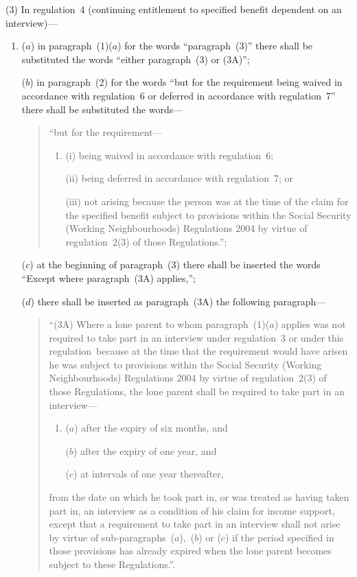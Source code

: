 \documentclass[12pt,a4paper]{article}
\begin{document}
(3) In regulation~4 (continuing entitlement to specified benefit dependent on an interview)—
\begin{enumerate}\item[]
($a$) in paragraph~(1)($a$)  for the words “paragraph~(3)” there shall be substituted the words “either paragraph~(3) or (3A)”;

($b$) in paragraph~(2) for the words “but for the requirement being waived in accordance with regulation~6 or deferred in accordance with regulation~7” there shall be substituted the words—
\begin{quotation}
    “but for the requirement—
\begin{enumerate}\item[]
    (i) 
    being waived in accordance with regulation~6;

    (ii) 
    being deferred in accordance with regulation~7; or

    (iii) 
    not arising because the person was at the time of the claim for the specified benefit subject to provisions within the Social Security (Working Neighbourhoods) Regulations 2004 by virtue of regulation~2(3) of those Regulations.”; 
\end{enumerate}
\end{quotation}

($c$) at the beginning of paragraph~(3) there shall be inserted the words “Except where paragraph~(3A) applies,”;

($d$) there shall be inserted as paragraph~(3A) the following paragraph—
\begin{quotation}
“(3A) Where a lone parent to whom paragraph~(1)($a$)  applies was not required to take part in an interview under regulation~3 or under this regulation~because at the time that the requirement would have arisen he was subject to provisions within the Social Security (Working Neighbourhoods) Regulations 2004 by virtue of regulation~2(3) of those Regulations, the lone parent shall be required to take part in an interview—
\begin{enumerate}\item[]
($a$) after the expiry of six months, and

($b$) after the expiry of one year, and

($c$) at intervals of one year thereafter,
\end{enumerate}
from the date on which he took part in, or was treated as having taken part in, an interview as a condition of his claim for income support, except that a requirement to take part in an interview shall not arise by virtue of sub-paragraphs~($a$),~($b$)  or ($c$)  if the period specified in those provisions has already expired when the lone parent becomes subject to these Regulations.”.
\end{quotation}
\end{enumerate}
\end{document}
